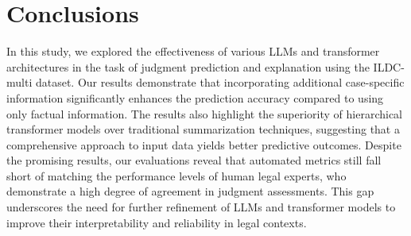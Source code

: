\section{Conclusions}
In this study, we explored the effectiveness of various LLMs and transformer architectures in the task of judgment prediction and explanation using the ILDC-multi dataset. Our results demonstrate that incorporating additional case-specific information significantly enhances the prediction accuracy compared to using only factual information. The results also highlight the superiority of hierarchical transformer models over traditional summarization techniques, suggesting that a comprehensive approach to input data yields better predictive outcomes. Despite the promising results, our evaluations reveal that automated metrics still fall short of matching the performance levels of human legal experts, who demonstrate a high degree of agreement in judgment assessments. This gap underscores the need for further refinement of LLMs and transformer models to improve their interpretability and reliability in legal contexts.
